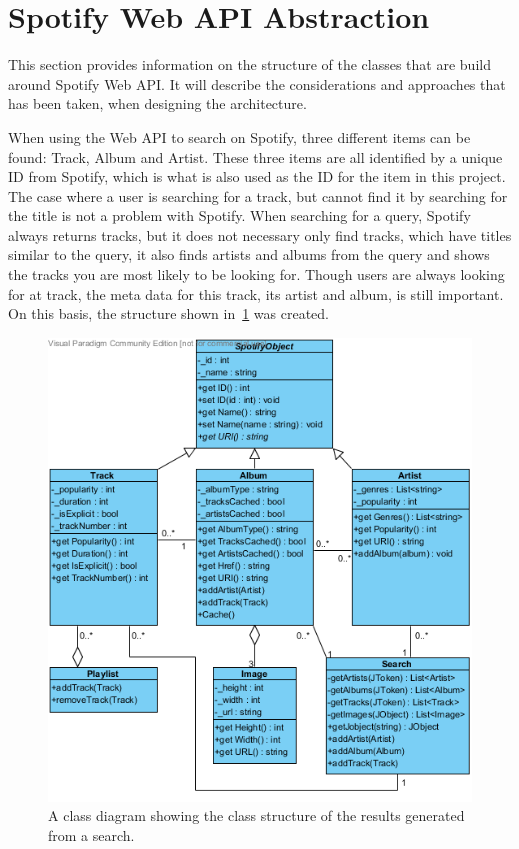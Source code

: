 \section{Spotify Web API Abstraction}
\label{imp:spotify_web_api}
This section provides information on the structure of the classes that are build around Spotify Web API. It will describe the considerations and approaches that has been taken, when designing the architecture.

When using the Web API to search on Spotify, three different items can be found: Track, Album and Artist. These three items are all identified by a unique ID from Spotify, which is what is also used as the ID for the item in this project. The case where a user is searching for a track, but cannot find it by searching for the title is not a problem with Spotify. When searching for a query, Spotify always returns tracks, but it does not necessary only find tracks, which have titles similar to the query, it also finds artists and albums from the query and shows the tracks you are most likely to be looking for. Though users are always looking for at track, the meta data for this track, its artist and album, is still important. On this basis, the structure shown in~\cref{fig:WebAPIUML} was created.

\begin{figure}[hbtp]
\centering
\includegraphics[width=\textwidth]{Images/WebAPIUML.png}
\caption[Class structure of the results generated from a search.]{A class diagram showing the class structure of the results generated from a search.}
\label{fig:WebAPIUML}
\end{figure}

